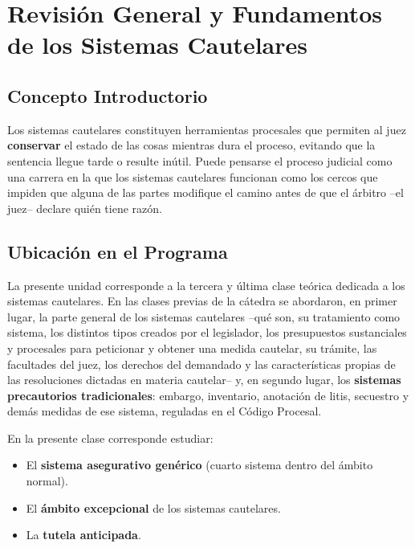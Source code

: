 \documentclass[12pt,oneside]{book}
\begin{document}
\tableofcontents

\chapter[Revisión General y Fundamentos]{Revisión General y Fundamentos de los Sistemas Cautelares}

\section{Concepto Introductorio}

Los sistemas cautelares constituyen herramientas procesales que permiten al juez \textbf{conservar} el estado de las cosas mientras dura el proceso, evitando que la sentencia llegue tarde o resulte inútil. Puede pensarse el proceso judicial como una carrera en la que los sistemas cautelares funcionan como los cercos que impiden que alguna de las partes modifique el camino antes de que el árbitro --el juez-- declare quién tiene razón.

\section{Ubicación en el Programa}

La presente unidad corresponde a la tercera y última clase teórica dedicada a los sistemas cautelares. En las clases previas de la cátedra se abordaron, en primer lugar, la parte general de los sistemas cautelares --qué son, su tratamiento como sistema, los distintos tipos creados por el legislador, los presupuestos sustanciales y procesales para peticionar y obtener una medida cautelar, su trámite, las facultades del juez, los derechos del demandado y las características propias de las resoluciones dictadas en materia cautelar-- y, en segundo lugar, los \textbf{sistemas precautorios tradicionales}: embargo, inventario, anotación de litis, secuestro y demás medidas de ese sistema, reguladas en el Código Procesal.

En la presente clase corresponde estudiar:
\begin{itemize}
    \item El \textbf{sistema asegurativo genérico} (cuarto sistema dentro del ámbito normal).
    \item El \textbf{ámbito excepcional} de los sistemas cautelares.
    \item La \textbf{tutela anticipada}.
\end{itemize}
\end{document}
